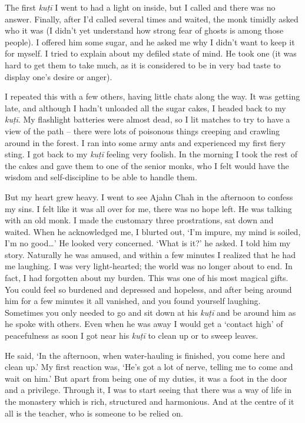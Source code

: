 The first \emph{kuṭī} I went to had a light on inside, but I called and
there was no answer. Finally, after I'd called several times and waited, 
the monk timidly asked who it was (I didn't yet understand how strong
fear of ghosts is among those people). I offered him some sugar, and he
asked me why I didn't want to keep it for myself. I tried to explain
about my defiled state of mind. He took one (it was hard to get them to
take much, as it is considered to be in very bad taste to display one's
desire or anger). 

I repeated this with a few others, having little chats along the way. It
was getting late, and although I hadn't unloaded all the sugar cakes, I
headed back to my \emph{kuṭī}. My flashlight batteries were almost dead, 
so I lit matches to try to have a view of the path -- there were lots of
poisonous things creeping and crawling around in the forest. I ran into
some army ants and experienced my first fiery sting. I got back to my
\emph{kuṭī} feeling very foolish. In the morning I took the rest of the
cakes and gave them to one of the senior monks, who I felt would have
the wisdom and self-discipline to be able to handle them. 

But my heart grew heavy. I went to see Ajahn Chah in the afternoon to
confess my sins. I felt like it was all over for me, there was no hope
left. He was talking with an old monk. I made the customary three
prostrations, sat down and waited. When he acknowledged me, I blurted
out, `I'm impure, my mind is soiled, I'm no good\ldots{}' He looked very
concerned. `What is it?' he asked. I told him my story. Naturally he was
amused, and within a few minutes I realized that he had me laughing. I
was very light-hearted; the world was no longer about to end. In fact, I
had forgotten about my burden. This was one of his most magical gifts. 
You could feel so burdened and depressed and hopeless, and after being
around him for a few minutes it all vanished, and you found yourself
laughing. Sometimes you only needed to go and sit down at his
\emph{kuṭī} and be around him as he spoke with others. Even when he was
away I would get a `contact high' of peacefulness as soon I got near his
\emph{kuṭī} to clean up or to sweep leaves. 

He said, `In the afternoon, when water-hauling is finished, you come
here and clean up.' My first reaction was, `He's got a lot of nerve, 
telling me to come and wait on him.' But apart from being one of my
duties, it was a foot in the door and a privilege. Through it, I was to
start seeing that there was a way of life in the monastery which is
rich, structured and harmonious. And at the centre of it all is the
teacher, who is someone to be relied on. 


